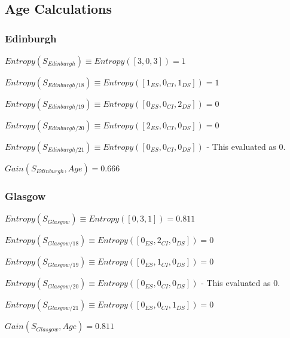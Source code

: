 \documentclass[8pt]{article}
\begin{document}
    \subsection{Age Calculations}

      \subsubsection{Edinburgh}
         $Entropy(S_{Edinburgh}) \equiv Entropy([3,0,3])=1$

        \begin{description}
          \setlength{\itemsep}{1pt}
          \setlength{\parskip}{0pt}
          \setlength{\parsep}{0pt}
          \item[]$Entropy(S_{Edinburgh/18})\equiv Entropy([1_{ES},0_{CI},1_{DS}]) = 1$
          \item[]$Entropy(S_{Edinburgh/19})\equiv Entropy([0_{ES},0_{CI},2_{DS}]) = 0$
          \item[]$Entropy(S_{Edinburgh/20})\equiv Entropy([2_{ES},0_{CI},0_{DS}]) = 0$
          \item[]$Entropy(S_{Edinburgh/21})\equiv Entropy([0_{ES},0_{CI},0_{DS}])$ - This evaluated as 0.
          \item[]$Gain(S_{Edinburgh},Age)= 0.666$
        \end{description}


      \subsubsection{Glasgow}
        $Entropy(S_{Glasgow}) \equiv Entropy([0,3,1])=0.811$

        \begin{description}
          \setlength{\itemsep}{1pt}
          \setlength{\parskip}{0pt}
          \setlength{\parsep}{0pt}
          \item[]$Entropy(S_{Glasgow/18})\equiv Entropy([0_{ES},2_{CI},0_{DS}]) = 0$
          \item[]$Entropy(S_{Glasgow/19})\equiv Entropy([0_{ES},1_{CI},0_{DS}]) = 0$
          \item[]$Entropy(S_{Glasgow/20})\equiv Entropy([0_{ES},0_{CI},0_{DS}])$ - This evaluated as 0.
          \item[]$Entropy(S_{Glasgow/21})\equiv Entropy([0_{ES},0_{CI},1_{DS}]) = 0$
          \item[]$Gain(S_{Glasgow},Age)= 0.811$
        \end{description}
\end{document}
